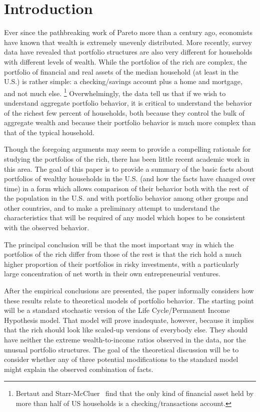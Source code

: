 \documentclass[12pt]{article}
\begin{document}
\clearpage

\section{Introduction}

Ever since the pathbreaking work of Pareto more than a century ago,
economists have known that wealth is extremely unevenly distributed. More
recently, survey data have revealed that portfolio structures are also very
different for households with different levels of wealth. While the
portfolios of the rich are complex, the portfolio of financial and real
assets of the median household (at least in the U.S.) is rather simple: a
checking/savings account plus a home and mortgage, and not much else.%
\footnote{%
Bertaut and Starr-McCluer~\cite{b&s-m:usportfolios} find that the only kind
of financial asset held by more than half of US households is a
checking/transactions account.} Overwhelmingly, the data tell us that if we
wish to understand aggregate portfolio behavior, it is critical to
understand the behavior of the richest few percent of households, both
because they control the bulk of aggregate wealth and because their
portfolio behavior is much more complex than that of the typical household.

Though the foregoing arguments may seem to provide a compelling rationale
for studying the portfolios of the rich, there has been little recent
academic work in this area. The goal of this paper is to provide a summary
of the basic facts about portfolios of wealthy households in the U.S. (and
how the facts have changed over time) in a form which allows comparison of
their behavior both with the rest of the population in the U.S. and with
portfolio behavior among other groups and other countries, and to make a preliminary attempt to
understand the characteristics that will be required of any model which
hopes to be consistent with the observed behavior.

The principal conclusion will be that the most important way in which the
portfolios of the rich differ from those of the rest is that the rich hold a
much higher proportion of their portfolios in risky investments, with a
particularly large concentration of net worth in their own entrepreneurial
ventures.

After the empirical conclusions are presented, the paper informally
considers how these results relate to theoretical models of portfolio
behavior. The starting point will be a standard stochastic version of the
Life Cycle/Permanent Income Hypothesis model. That model will prove
inadequate, however, because it implies that the rich should look like
scaled-up versions of everybody else. They should have neither the extreme
wealth-to-income ratios observed in the data, nor the unusual portfolio
structures. The goal of the theoretical discussion will be to consider
whether any of three potential modifications to the standard model might
explain the observed combination of facts.
\end{document}
